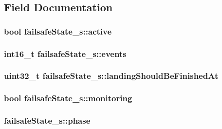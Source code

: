 \subsection{Field Documentation}
\hypertarget{structfailsafeState__s_a327ffec6f10e40d22a082ca51f86f1ef}{
\subsubsection[{active}]{\setlength{\rightskip}{0pt plus 5cm}bool failsafe\+State\+\_\+s\+::active}}\label{structfailsafeState__s_a327ffec6f10e40d22a082ca51f86f1ef}
\hypertarget{structfailsafeState__s_ab4ddace9d6b11a4979497cc5bf69dd05}{
\subsubsection[{events}]{\setlength{\rightskip}{0pt plus 5cm}int16\+\_\+t failsafe\+State\+\_\+s\+::events}}\label{structfailsafeState__s_ab4ddace9d6b11a4979497cc5bf69dd05}
\hypertarget{structfailsafeState__s_adbae38620a7cb8b9d5bd55ed3d81b8ac}{
\subsubsection[{landing\+Should\+Be\+Finished\+At}]{\setlength{\rightskip}{0pt plus 5cm}uint32\+\_\+t failsafe\+State\+\_\+s\+::landing\+Should\+Be\+Finished\+At}}\label{structfailsafeState__s_adbae38620a7cb8b9d5bd55ed3d81b8ac}
\hypertarget{structfailsafeState__s_ae68d679effd677071564db5ead0bee7a}{
\subsubsection[{monitoring}]{\setlength{\rightskip}{0pt plus 5cm}bool failsafe\+State\+\_\+s\+::monitoring}}\label{structfailsafeState__s_ae68d679effd677071564db5ead0bee7a}
\hypertarget{structfailsafeState__s_adf772730db138b9082c1fa4b6b6e5b4d}{
\subsubsection[{phase}]{ failsafe\+State\+\_\+s\+::phase}}\label{structfailsafeState__s_adf772730db138b9082c1fa4b6b6e5b4d}
